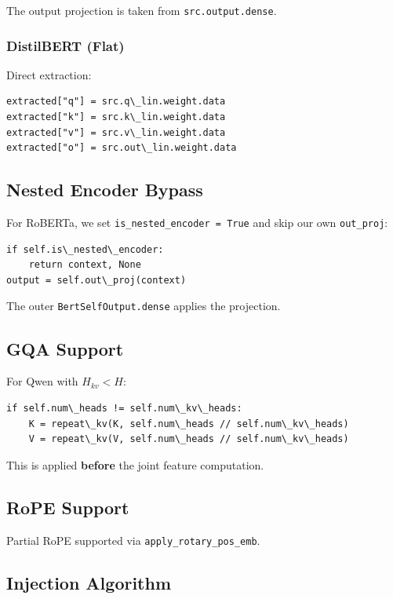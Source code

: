 The output projection is taken from \texttt{src.output.dense}.

\subsubsection{DistilBERT (Flat)}

Direct extraction:

\begin{lstlisting}
extracted["q"] = src.q\_lin.weight.data
extracted["k"] = src.k\_lin.weight.data
extracted["v"] = src.v\_lin.weight.data
extracted["o"] = src.out\_lin.weight.data
\end{lstlisting}

\subsection{Nested Encoder Bypass}

For RoBERTa, we set \texttt{is\_nested\_encoder = True} and skip our own \texttt{out\_proj}:

\begin{lstlisting}
if self.is\_nested\_encoder:
    return context, None
output = self.out\_proj(context)
\end{lstlisting}

The outer \texttt{BertSelfOutput.dense} applies the projection.

\subsection{GQA Support}

For Qwen with $H_{kv} < H$:

\begin{lstlisting}
if self.num\_heads != self.num\_kv\_heads:
    K = repeat\_kv(K, self.num\_heads // self.num\_kv\_heads)
    V = repeat\_kv(V, self.num\_heads // self.num\_kv\_heads)
\end{lstlisting}

This is applied \textbf{before} the joint feature computation.

\subsection{RoPE Support}

Partial RoPE supported via \texttt{apply\_rotary\_pos\_emb}.

\subsection{Injection Algorithm}

